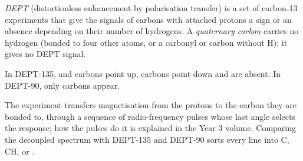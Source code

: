 \begin{definition}[DEPT]\label{def:b2:structure-determination:dept}
\emph{DEPT} (distortionless enhancement by polarisation transfer) is a set of carbon-13
experiments that give the signals of carbons with attached protons a sign or an absence depending on
their number of hydrogens. A \emph{quaternary carbon} carries no hydrogen
(bonded to four other atoms, or a carbonyl or  carbon without H); it gives no DEPT signal.
\end{definition}

\begin{proposition}\label{prop:b2:structure-determination:dept}
In DEPT-135,  and  carbons point up,  carbons point down and 
are absent. In DEPT-90, only  carbons appear.
\end{proposition}

\admitted

The experiment transfers magnetisation from the protons to the carbon they are bonded to, through a
sequence of radio-frequency pulses whose last angle selects the response; how the pulses do it is
explained in the Year 3 volume. Comparing the decoupled spectrum with DEPT-135 and DEPT-90 sorts every
line into C, CH,  or .

